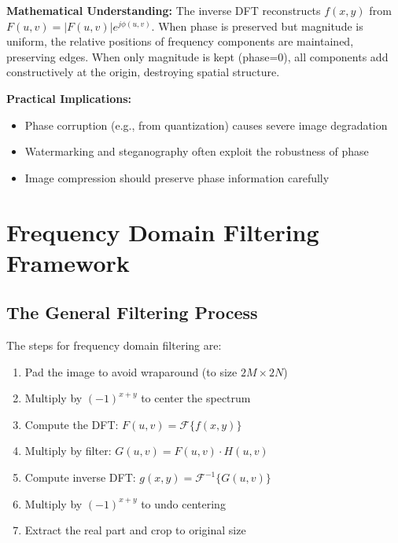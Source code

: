 \documentclass[12pt,a4paper]{article}
\begin{document}
\begin{deepexplanation}
\textbf{Mathematical Understanding:}
The inverse DFT reconstructs $f(x,y)$ from $F(u,v) = |F(u,v)|e^{j\phi(u,v)}$. When phase is preserved but magnitude is uniform, the relative positions of frequency components are maintained, preserving edges. When only magnitude is kept (phase=0), all components add constructively at the origin, destroying spatial structure.

\textbf{Practical Implications:}
\begin{itemize}
    \item Phase corruption (e.g., from quantization) causes severe image degradation
    \item Watermarking and steganography often exploit the robustness of phase
    \item Image compression should preserve phase information carefully
\end{itemize}
\end{deepexplanation}

\section{Frequency Domain Filtering Framework}

\subsection{The General Filtering Process}

The steps for frequency domain filtering are:

\begin{enumerate}
    \item Pad the image to avoid wraparound (to size $2M \times 2N$)
    \item Multiply by $(-1)^{x+y}$ to center the spectrum
    \item Compute the DFT: $F(u, v) = \mathcal{F}\{f(x, y)\}$
    \item Multiply by filter: $G(u, v) = F(u, v) \cdot H(u, v)$
    \item Compute inverse DFT: $g(x, y) = \mathcal{F}^{-1}\{G(u, v)\}$
    \item Multiply by $(-1)^{x+y}$ to undo centering
    \item Extract the real part and crop to original size
\end{enumerate}
\end{document}
